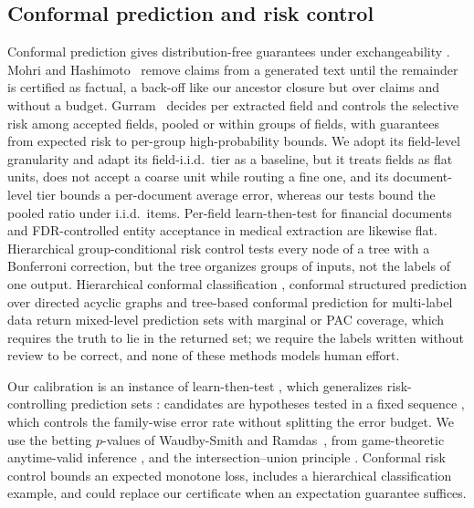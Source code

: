 \documentclass[preprint,12pt]{elsarticle}
\theoremstyle{definition}
\begin{document}
\subsection{Conformal prediction and risk control}
Conformal prediction gives distribution-free guarantees under exchangeability
\citep{vovk2022algorithmic,angelopoulos2023gentle}.
Mohri and Hashimoto~\cite{mohri2024language} remove claims from a generated text
until the remainder is certified as factual, a back-off like our ancestor
closure but over claims and without a budget. Gurram~\cite{gurram2026perfield}
decides per extracted field and controls the selective risk among accepted
fields, pooled or within groups of fields, with guarantees from expected risk to
per-group high-probability bounds. We adopt its field-level granularity and adapt its field-i.i.d.\ tier as a
baseline, but it treats fields as flat units, does not accept a coarse unit
while routing a fine one, and its document-level tier bounds a per-document
average error, whereas our tests bound the pooled ratio under i.i.d.\ items.
Per-field learn-then-test for financial documents \citep{jin2026stp} and
FDR-controlled entity acceptance in medical extraction
\citep{shrestha2026medical} are likewise flat.
Hierarchical group-conditional risk control \citep{salem2026hgcrc} tests every
node of a tree with a Bonferroni correction, but the tree organizes groups of
inputs, not the labels of one output. Hierarchical conformal classification
\citep{denhengst2025hierarchical,mortier2026conformal}, conformal structured
prediction over directed acyclic graphs \citep{zhang2025conformal} and
tree-based conformal prediction for multi-label data \citep{tyagi2023multilabel}
return mixed-level prediction sets with marginal or PAC coverage, which
requires the truth to lie in the returned set; we require the labels written
without review to be correct, and none of these methods models human effort.

Our calibration is an instance of learn-then-test
\citep{angelopoulos2025learnthen}, which generalizes risk-controlling prediction
sets \citep{bates2021rcps}: candidates are hypotheses tested in a fixed sequence
\citep{bauer1991multiple}, which controls the family-wise error rate without
splitting the error budget. We use the betting $p$-values of
Waudby-Smith and Ramdas~\cite{waudbysmith2024estimating}, from game-theoretic
anytime-valid inference \citep{ramdas2023game}, and the intersection--union
principle \citep{berger1982multiparameter}. Conformal risk control
\citep{angelopoulos2024conformal} bounds an expected monotone loss, includes a
hierarchical classification example, and could replace our certificate when an
expectation guarantee suffices.
\end{document}
